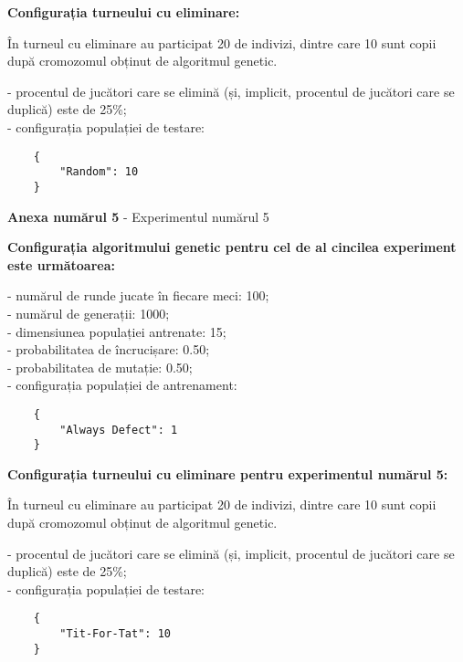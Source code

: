 \textbf{Configurația turneului cu eliminare: }

În turneul cu eliminare au participat 20 de indivizi, dintre care 10 sunt copii după cromozomul obținut de algoritmul genetic. 

- procentul de jucători care se elimină (și, implicit, procentul de jucători care se duplică) este de 25\%;\\
- configurația populației de testare:\\
\begin{center}
	\begin{lstlisting}
	{
		"Random": 10
	}
	\end{lstlisting}
\end{center}

\clearpage

\begin{center}
	\textbf{Anexa numărul 5} - Experimentul numărul 5
\end{center}

\textbf{Configurația algoritmului genetic pentru cel de al cincilea experiment este următoarea:}

- numărul de runde jucate în fiecare meci: 100;\\
- numărul de generații: 1000;\\
- dimensiunea populației antrenate: 15;\\
- probabilitatea de încrucișare: 0.50;\\
- probabilitatea de mutație: 0.50;\\
- configurația populației de antrenament:\\
\begin{center}
	\begin{lstlisting}
	{
		"Always Defect": 1
	}
	\end{lstlisting}
\end{center}

\textbf{Configurația turneului cu eliminare pentru experimentul numărul 5:}

În turneul cu eliminare au participat 20 de indivizi, dintre care 10 sunt copii după cromozomul obținut de algoritmul genetic. 

- procentul de jucători care se elimină (și, implicit, procentul de jucători care se duplică) este de 25\%;\\
- configurația populației de testare:\\
\begin{center}
	\begin{lstlisting}
	{
		"Tit-For-Tat": 10
	}
	\end{lstlisting}
\end{center}

